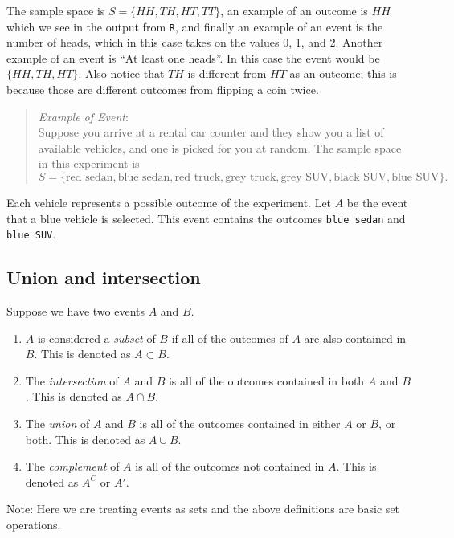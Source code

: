 \documentclass[
]{book}
\begin{document}
The sample space is \(S=\{HH, TH, HT, TT\}\), an example of an outcome is \(HH\) which we see in the output from \texttt{R}, and finally an example of an event is the number of heads, which in this case takes on the values 0, 1, and 2. Another example of an event is ``At least one heads''. In this case the event would be \(\{HH,TH, HT\}\). Also notice that \(TH\) is different from \(HT\) as an outcome; this is because those are different outcomes from flipping a coin twice.

\begin{quote}
\emph{Example of Event}:\\
Suppose you arrive at a rental car counter and they show you a list of available vehicles, and one is picked for you at random. The sample space in this experiment is
\[
S=\{\mbox{red sedan}, \mbox{blue sedan}, \mbox{red truck}, \mbox{grey truck}, \mbox{grey SUV}, \mbox{black SUV}, \mbox{blue SUV}\}.
\]
\end{quote}

Each vehicle represents a possible outcome of the experiment. Let \(A\) be the event that a blue vehicle is selected. This event contains the outcomes \texttt{blue\ sedan} and \texttt{blue\ SUV}.

\hypertarget{union-and-intersection}{%
\subsection{Union and intersection}\label{union-and-intersection}}

Suppose we have two events \(A\) and \(B\).

\begin{enumerate}
\def\labelenumi{\arabic{enumi})}
\item
  \(A\) is considered a \emph{subset} of \(B\) if all of the outcomes of \(A\) are also contained in \(B\). This is denoted as \(A \subset B\).
\item
  The \emph{intersection} of \(A\) and \(B\) is all of the outcomes contained in both \(A\) and \(B\). This is denoted as \(A \cap B\).
\item
  The \emph{union} of \(A\) and \(B\) is all of the outcomes contained in either \(A\) or \(B\), or both. This is denoted as \(A \cup B\).
\item
  The \emph{complement} of \(A\) is all of the outcomes not contained in \(A\). This is denoted as \(A^C\) or \(A'\).
\end{enumerate}

Note: Here we are treating events as sets and the above definitions are basic set operations.
\end{document}
